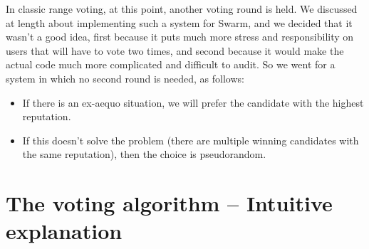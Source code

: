 \documentclass[submission, copyright,creativecommons,sharealike,noncommercial]{eptcs}
\begin{document}
	In classic range voting, at this point, another voting round is held. We discussed at length about implementing such a system for Swarm, and we decided that it wasn't a good idea, first because it puts much more stress and responsibility on users that will have to vote two times, and second because it would make the actual code much more complicated and difficult to audit. So we went for a system in which no second round is needed, as follows:
	\begin{itemize}
		\item If there is an ex-aequo situation, we will prefer the candidate with the highest reputation.
		\item If this doesn't solve the problem (there are multiple winning candidates with the same reputation), then the choice is pseudorandom.
	\end{itemize}
%
%
\section{The voting algorithm -- Intuitive explanation}\label{sec:Voting intuitive}
%
\end{document}
